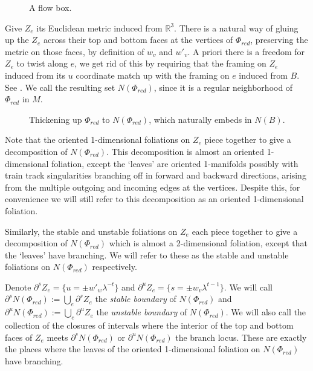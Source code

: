 \documentclass[12pt]{amsart}
\theoremstyle{definition}
\numberwithin{equation}{section}
\begin{document}
\begin{figure}
    \centering
    \fontsize{16pt}{16pt}\selectfont
    \resizebox{!}{4cm}{}
    \caption{A flow box.}
    \label{fig:flowbox}
\end{figure}

Give $Z_e$ its Euclidean metric induced from $\mathbb{R}^3$. There is a natural way of gluing up the $Z_e$ across their top and bottom faces at the vertices of $\Phi_{red}$, preserving the metric on those faces, by definition of $w_v$ and $w'_v$. A priori there is a freedom for $Z_e$ to twist along $e$, we get rid of this by requiring that the framing on $Z_e$ induced from its $u$ coordinate match up with the framing on $e$ induced from $B$. See . We call the resulting set $N(\Phi_{red})$, since it is a regular neighborhood of $\Phi_{red}$ in $M$.

\begin{figure}
    \centering
    \fontsize{14pt}{14pt}\selectfont
    \resizebox{!}{8cm}{}
    \caption{Thickening up $\Phi_{red}$ to $N(\Phi_{red})$, which naturally embeds in $N(B)$.}
    \label{fig:thicken}
\end{figure}

Note that the oriented 1-dimensional foliations on $Z_e$ piece together to give a decomposition of $N(\Phi_{red})$. This decomposition is almost an oriented 1-dimensional foliation, except the `leaves' are oriented 1-manifolds possibly with train track singularities branching off in forward and backward directions, arising from the multiple outgoing and incoming edges at the vertices. Despite this, for convenience we will still refer to this decomposition as an oriented 1-dimensional foliation. 

Similarly, the stable and unstable foliations on $Z_e$ each piece together to give a decomposition of $N(\Phi_{red})$ which is almost a 2-dimensional foliation, except that the `leaves' have branching. We will refer to these as the stable and unstable foliations on $N(\Phi_{red})$ respectively. 

Denote $\partial^s Z_e=\{u= \pm w'_w \lambda^{-t}\}$ and $\partial^u Z_e=\{s= \pm w_v \lambda^{t-1}\}$. We will call $\partial^s N(\Phi_{red}) := \bigcup_e \partial^s Z_e$ the \textit{stable boundary} of $N(\Phi_{red})$ and $\partial^u N(\Phi_{red}) := \bigcup_e \partial^u Z_e$ the \textit{unstable boundary} of $N(\Phi_{red})$. We will also call the collection of the closures of intervals where the interior of the top and bottom faces of $Z_e$ meets $\partial^s N(\Phi_{red})$ or $\partial^u N(\Phi_{red})$ the branch locus. These are exactly the places where the leaves of the oriented 1-dimensional foliation on $N(\Phi_{red})$ have branching.
\end{document}
